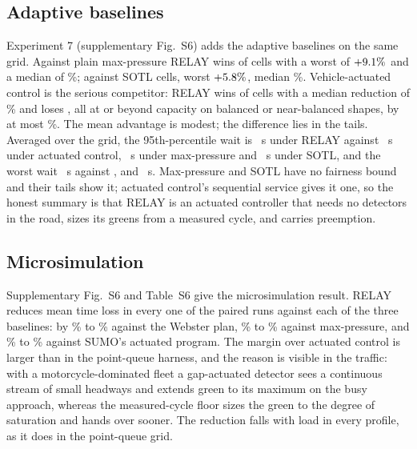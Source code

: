 \documentclass[journal]{IEEEtran}
\newcommand{\relay}{RELAY}
\begin{document}
\subsection{Adaptive baselines}
\label{sec:policies}

Experiment 7 (supplementary Fig.~S6) adds the adaptive baselines on the same grid. Against plain max-pressure
\relay{} wins \PolMaxpressureWins{} of \GridCells{} cells with a worst of $+9.1\%$ and a
median of \PolMaxpressureMedian\%; against SOTL \PolSotlWins{} cells, worst $+5.8\%$, median
\PolSotlMedian\%. Vehicle-actuated control is the serious competitor: \relay{} wins \PolActuatedWins{} of
\GridCells{} cells with a median reduction of \PolActuatedMedian\% and loses \PolActuatedLosses{}, all at or
beyond capacity on balanced or near-balanced shapes, by at most \PolActuatedLossMax\%. The mean advantage is
modest; the difference lies in the tails. Averaged over the grid, the 95th-percentile wait is
\PolRelayPNinetyFive~s under \relay{} against \PolActuatedPNinetyFive~s under actuated control,
\PolMaxpressurePNinetyFive~s under max-pressure and \PolSotlPNinetyFive~s under SOTL, and the worst wait
\PolRelayMax~s against \PolActuatedMax, \PolMaxpressureMax{} and \PolSotlMax~s. Max-pressure and SOTL have no fairness bound and their tails show it; actuated control's sequential
service gives it one, so the honest summary is that \relay{} is an actuated controller that needs no
detectors in the road, sizes its greens from a measured cycle, and carries preemption.

\subsection{Microsimulation}
\label{sec:sumo}

Supplementary Fig.~S6 and Table~S6 give the microsimulation result. \relay{} reduces mean time loss
in every one of the \SumoWebsterRuns{} paired runs against each of the three baselines: by \SumoWebsterMin\% to
\SumoWebsterMax\% against the Webster plan, \SumoMaxpressureMin\% to \SumoMaxpressureMax\% against max-pressure,
and \SumoActuatedMin\% to \SumoActuatedMax\% against SUMO's actuated program. The margin over actuated control is larger than in the point-queue harness, and the reason is visible in the traffic: with a
motorcycle-dominated fleet a gap-actuated detector sees a continuous stream of small headways and extends
green to its maximum on the busy approach, whereas the measured-cycle floor sizes the green to the degree of
saturation and hands over sooner. The reduction falls with load in every profile, as it does in the point-queue grid.
\end{document}
